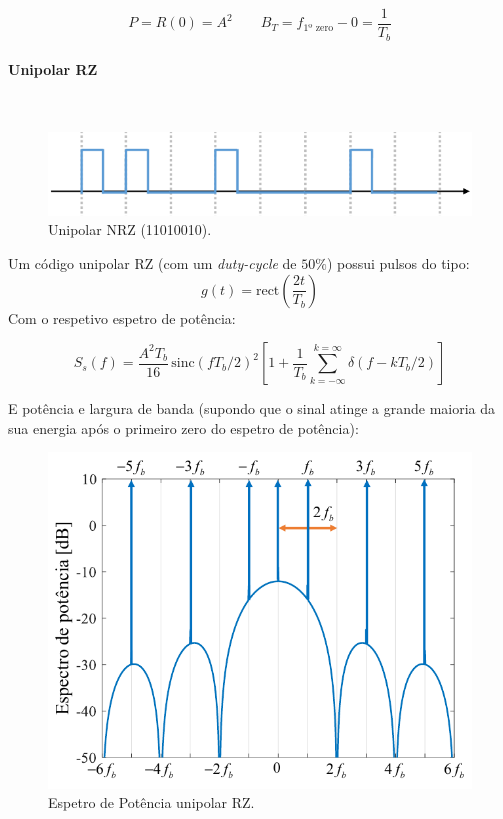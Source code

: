$$
    \boxed{P = R(0) = A^2}\qquad
    \boxed{B_T = f_{\text{1º zero}} - 0 = \frac{1}{T_b}}
$$


\clearpage
\paragraph*{Unipolar RZ}\mbox{}\\
\label{line:unipolarRZ}
\begin{figure}[H]
    \centering
    \includegraphics[width = 0.8\linewidth]{img/digital/line-codes/LUnipolarRZ.png}
    \caption{Unipolar NRZ (11010010).}
    \label{fig:LUnipolarRZ}
\end{figure}
\noindent Um código unipolar RZ (com um \textit{duty-cycle} de $50\%$) possui pulsos do tipo:
$$
    g(t) = \text{rect}\left(\frac{2t}{T_b}\right)
$$
\noindent Com o respetivo espetro de potência:

$$
    \boxed{S_s(f) = \frac{A^2 T_b}{16}\, \text{sinc}(fT_b/2)^2\left[1 + \frac{1}{T_b}\sum_{k = -\infty}^{k = \infty}\delta(f-kT_b/2)\right]}
$$

\noindent E potência e largura de banda (supondo que o sinal atinge a grande maioria da sua energia após o primeiro zero do espetro de potência):

\begin{figure}[H]
    \centering
    \includegraphics[width = 0.7\linewidth]{img/digital/line-codes/PUnipolarRZ.png}
    \caption{Espetro de Potência unipolar RZ.}
    \label{fig:PUnipolarRZ}
\end{figure}

